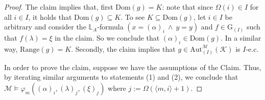 \documentclass[10pt,a4paper]{amsart}
\newcommand{\A}{\mathrm{Aut}}
\newcommand{\Aa}{\A_{(I)}^{\M}(\K)}
\newcommand{\G}{\mathrm{G}}
\newcommand{\K}{\mathcal{K}}
\newcommand{\M}{\mathcal{M}}
\begin{document}
\begin{proof}
The claim implies that, first $\mathrm{Dom}(g)=K$:  note that since $\Omega(i)\in I$ for all $i\in I$, it holds that $\mathrm{Dom}(g)\subseteq K $. To see $K\subseteq \mathrm{Dom}(g)$, let $i\in I$ be arbitrary and consider  the $\mathbb{L}_{A}$-formula $(x=(\alpha)_{i} \ \wedge \ y=y)$ and $f\in\G_{(I)} $ such that $f(\lambda)=\xi$ in the claim. So we conclude that $(\alpha)_{i}\in \mathrm{Dom}(g)$. In a similar way, $\mathrm{Range}(g)=K$. Secondly, the claim implies that $g\in\Aa$ is $I$-e.c.
	
	In order to prove the claim, suppose we have the assumptions of the Claim. Thus, by iterating similar arguments to statements (1) and (2), we conclude that $\M\models\varphi_{m}((\alpha)_{i},(\lambda)_{j},(\xi)_{j})$ where $j:=\Omega(\langle m,i\rangle+1)$.
\end{proof}
\end{document}
